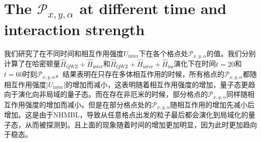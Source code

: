 \documentclass[longbibliography, aps, prx, amsmath, amssymb, amsfonts, twocolumn,superscriptaddress, footinbib]{revtex4-1}
\begin{document}
	
	\appendix

	\section{The $\mathcal{P}_{x,y,\alpha}$ at different time and interaction strength~\label{sec:AllP}}

	我们研究了在不同时间和相互作用强度$U_{\text{inter}}$下在各个格点处$\mathcal{P}_{x,y,\alpha}$的值。我们分别计算了在哈密顿量$\hat{H}_{\text{QWZ}}+\hat{H}_{\text{inter}}$和$\hat{H}_{\text{QWZ}}+\hat{H}_{\text{inter}}+\hat{H}_{\text{im}}$演化下在时间$t=20$和$t=60$时刻$\mathcal{P}_{x,y,\alpha}$。结果表明在只存在多体相互作用的时候，所有格点的$\mathcal{P}_{x,y,\alpha}$都随相互作用强度$\vert U_{\text{inter}} \vert$的增加而减小，这表明随着相互作用强度的增加，量子态更趋向于演化向非局域的量子态。而在存在非厄米的时候，部分格点的$\mathcal{P}_{x,y,\alpha}$同样随相互作用强度的增加而减小。但是在部分格点处的$\mathcal{P}_{x,y,\alpha}$随相互作用的增加先减小后增加。这是由于NHMBL，导致从任意格点出发的粒子最后都会演化到局域化的量子态，从而被探测到。且上面的现象随着时间的增加更加明显，因为此时更加趋向于稳态。
\end{document}
